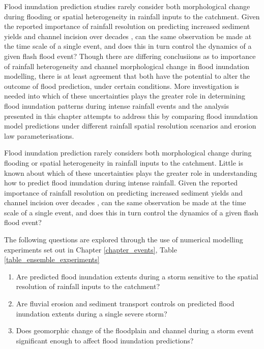 Flood inundation prediction studies rarely consider both morphological change during flooding or spatial heterogeneity in rainfall inputs to the catchment. Given the reported importance of rainfall resolution on predicting increased sediment yields and channel incision over decades \citep{coulthard2016sensitivity}, can the same observation be made at the time scale of a single event, and does this in turn control the dynamics of a given flash flood event? Though there are differing conclusiions as to importance of rainfall heterogeneity and channel morphological change in flood inundation modelling, there is at least agreement that both have the potential to alter the outcome of flood prediction, under certain conditions. More investigation is needed into which of these uncertainties plays the greater role in determining flood inundation patterns during intense rainfall events and the analysis presented in this chapter attempts to address this by comparing flood inundation model predictions under different rainfall spatial resolution scenarios and erosion law parameterisations. 


Flood inundation prediction rarely considers both morphological change during flooding or spatial heterogeneity in rainfall inputs to the catchment. Little is known about which of these uncertainties plays the greater role in understanding how to predict flood inundation during intense rainfall. Given the reported importance of rainfall resolution on predicting increased sediment yields and channel incision over decades \citep{coulthard2016sensitivity}, can the same observation be made at the time scale of a single event, and does this in turn control the dynamics of a given flash flood event?

The following questions are explored through the use of numerical modelling experiments set out in Chapter \ref{chapter_events}, Table \ref{table_ensemble_experiments}

\begin{enumerate}
\item Are predicted flood inundation extents during a storm sensitive to the spatial resolution of rainfall inputs to the catchment?
\item Are fluvial erosion and sediment transport controls on predicted flood inundation extents during a single severe storm?
\item Does geomorphic change of the floodplain and channel during a storm event significant enough to affect flood inundation predictions?
\end{enumerate}

